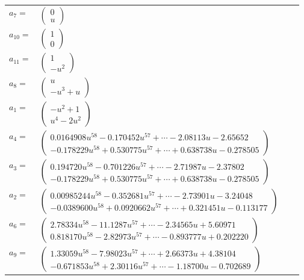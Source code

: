 \documentclass[1p]{elsarticle_modified}
\theoremstyle{definition}
\begin{document}
\begin{tabular}{m{7pt} m{180pt} m{7pt} m{180pt} }
\flushright $a_{7}=$&$\begin{pmatrix}0\\u\end{pmatrix}$ \\
\flushright $a_{10}=$&$\begin{pmatrix}1\\0\end{pmatrix}$ \\
\flushright $a_{11}=$&$\begin{pmatrix}1\\- u^2\end{pmatrix}$ \\
\flushright $a_{8}=$&$\begin{pmatrix}u\\- u^3+u\end{pmatrix}$ \\
\flushright $a_{1}=$&$\begin{pmatrix}- u^2+1\\u^4-2 u^2\end{pmatrix}$ \\
\flushright $a_{4}=$&$\begin{pmatrix}0.0164908 u^{58}-0.170452 u^{57}+\cdots-2.08113 u-2.65652\\-0.178229 u^{58}+0.530775 u^{57}+\cdots+0.638738 u-0.278505\end{pmatrix}$ \\
\flushright $a_{3}=$&$\begin{pmatrix}0.194720 u^{58}-0.701226 u^{57}+\cdots-2.71987 u-2.37802\\-0.178229 u^{58}+0.530775 u^{57}+\cdots+0.638738 u-0.278505\end{pmatrix}$ \\
\flushright $a_{2}=$&$\begin{pmatrix}0.00985244 u^{58}-0.352681 u^{57}+\cdots-2.73901 u-3.24048\\-0.0389600 u^{58}+0.0920662 u^{57}+\cdots+0.321451 u-0.113177\end{pmatrix}$ \\
\flushright $a_{6}=$&$\begin{pmatrix}2.78334 u^{58}-11.1287 u^{57}+\cdots-2.34565 u+5.60971\\0.818170 u^{58}-2.82973 u^{57}+\cdots-0.893777 u+0.202220\end{pmatrix}$ \\
\flushright $a_{9}=$&$\begin{pmatrix}1.33059 u^{58}-7.98023 u^{57}+\cdots+2.66373 u+4.38104\\-0.671853 u^{58}+2.30116 u^{57}+\cdots-1.18700 u-0.702689\end{pmatrix}$ \\

\end{tabular}
\end{document}
